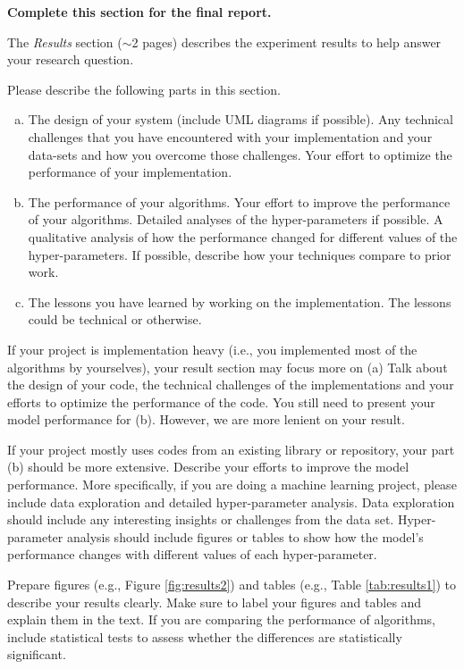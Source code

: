\documentclass[letterpaper]{article} %
\begin{document}
{\bf Complete this section for the final report.}

The {\it Results} section ($\sim$2 pages) describes the experiment results to help answer your research question.

Please describe the following parts in this section.
\begin{enumerate}[(a)]
    \item The design of your system (include UML diagrams if possible). Any technical challenges that you have encountered with your implementation and your data-sets and how you overcome those challenges. Your effort to optimize the performance of your implementation.
    \item The performance of your algorithms. Your effort to improve the performance of your algorithms. Detailed analyses of the hyper-parameters if possible. A qualitative analysis of how the performance changed for different values of the hyper-parameters. If possible, describe how your techniques compare to prior work. 
    \item The lessons you have learned by working on the implementation. The lessons could be technical or otherwise.
\end{enumerate}

If your project is implementation heavy (i.e., you implemented most of the algorithms by yourselves), your result section may focus more on (a) Talk about the design of your code, the technical challenges of the implementations and your efforts to optimize the performance of the code. You still need to present your model performance for (b). However, we are more lenient on your result.

If your project mostly uses codes from an existing library or repository, your part (b) should be more extensive. Describe your efforts to improve the model performance. More specifically, if you are doing a machine learning project, please include data exploration and detailed hyper-parameter analysis. Data exploration should include any interesting insights or challenges from the data set. Hyper-parameter analysis should include figures or tables to show how the model's performance changes with different values of each hyper-parameter. 

Prepare figures (e.g., Figure \ref{fig:results2}) and tables (e.g., Table \ref{tab:results1}) to describe your results clearly. Make sure to label your figures and tables and explain them in the text. If you are comparing the performance of algorithms, include statistical tests to assess whether the differences are statistically significant. 
\end{document}
